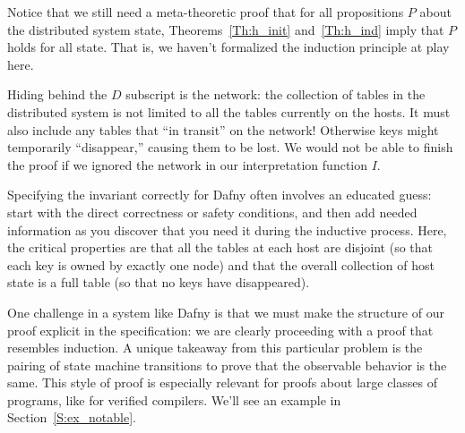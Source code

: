 Notice that we still need a meta-theoretic proof that for all propositions \(P\)
about the distributed system state, Theorems~\ref{Th:h_init} and~\ref{Th:h_ind}
imply that \(P\) holds for all state. That is, we haven't formalized the
induction principle at play here.

\begin{rem}
    Hiding behind the \(D\) subscript is the network: the collection of tables
    in the distributed system is not limited to all the tables currently on the
    hosts. It must also include any tables that ``in transit'' on the network!
    Otherwise keys might temporarily ``disappear,'' causing them to be lost. We
    would not be able to finish the proof if we ignored the network in our
    interpretation function \(I\).
\end{rem}

Specifying the invariant correctly for Dafny often involves an educated guess:
start with the direct correctness or safety conditions, and then add needed
information as you discover that you need it during the inductive process. Here,
the critical properties are that all the tables at each host are disjoint (so
that each key is owned by exactly one node) and that the overall collection of
host state is a full table (so that no keys have disappeared).

One challenge in a system like Dafny is that we must make the structure of our
proof explicit in the specification: we are clearly proceeding with a proof that
resembles induction. A unique takeaway from this particular problem is the
pairing of state machine transitions to prove that the observable behavior is
the same. This style of proof is especially relevant for proofs about large
classes of programs, like for verified compilers. We'll see an example in
Section~\ref{S:ex_notable}.

